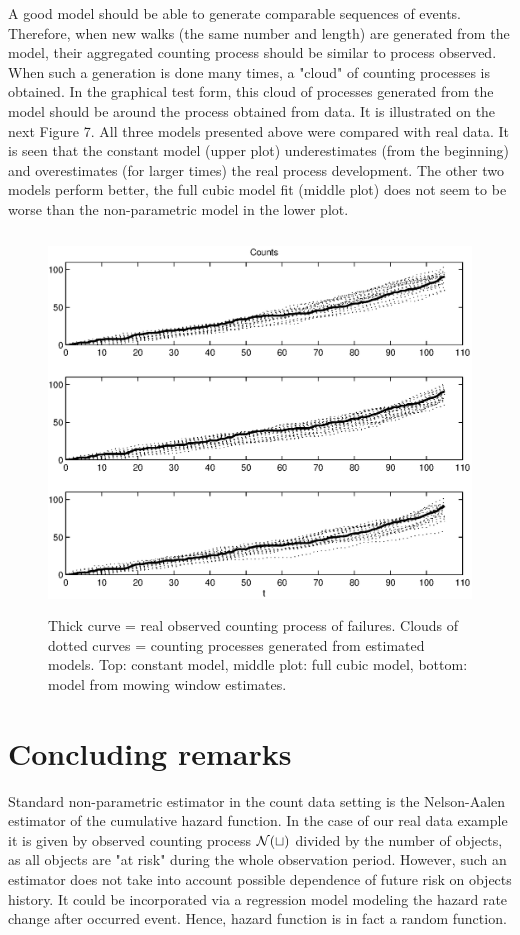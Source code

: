 \documentclass[11pt]{article}
\begin{document}
A good model should be able to generate comparable sequences of
events. Therefore, when new walks (the same number and length) are
generated from the model, their aggregated counting process should
be similar to process observed. When such a generation is done
many times, a "cloud" of counting processes is obtained. In the
graphical test form, this cloud of processes generated from the
model should be around the process obtained from data. It is
illustrated on the next Figure 7. All three models presented above
were compared with real data. It is seen that the constant model
(upper plot) underestimates (from the beginning) and overestimates
(for larger times) the real process development. The other two
models perform better, the full cubic model fit (middle plot) does
not seem to be worse than the non-parametric model in the lower
plot.

\begin{figure}[h]
\centering
    \includegraphics[width = 12cm,height=10cm]{comp_fit.eps}
\caption{Thick curve = real observed counting process of failures.
Clouds of dotted curves = counting processes generated from
estimated models. Top: constant model, middle plot: full cubic
model, bottom: model from mowing window estimates.}
\end{figure}

\section{Concluding remarks}

Standard non-parametric estimator in the count data setting is the
Nelson-Aalen estimator of the cumulative hazard function. In the
case of our real data example it is given by observed counting
process $\cal{N}(t)$ divided by the number of objects, as all objects
are "at risk" during the whole observation period. However, such
an estimator does not take into account possible dependence of
future risk on objects history. It could be incorporated via a
regression model modeling the hazard rate change after occurred
event. Hence, hazard function is in fact a random function.
\end{document}
